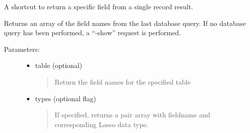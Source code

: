 \documentclass[letterpaper,10pt,english]{sphinxmanual}
\begin{document}
\begin{fulllineitems}
\begin{fulllineitems}
\end{fulllineitems}


\begin{fulllineitems}
\label{knop_database:knop_database.field}
A shortcut to return a specific field from a single record result.

\end{fulllineitems}


\begin{fulllineitems}
\label{knop_database:knop_database.field_names}
Returns an array of the field names from the last database query. If no database
query has been performed, a ``-show'' request is performed.
\begin{description}
\item[{Parameters:}] \leavevmode\begin{itemize}
\item {} 
table (optional)
\begin{quote}

Return the field names for the specified table
\end{quote}

\item {} 
types (optional flag)
\begin{quote}

If specified, returns a pair array with fieldname and corresponding Lasso data type.
\end{quote}

\end{itemize}

\end{description}

\end{fulllineitems}



\begin{fulllineitems}
\end{fulllineitems}


\end{fulllineitems}
\end{document}
